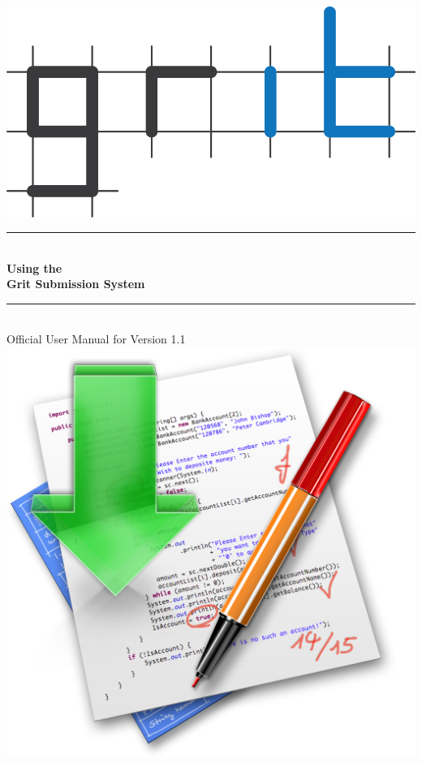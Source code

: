\documentclass[10pt,a4paper, titlepage, toc=idx]{scrreprt}
\newcommand{\HRule}{\rule{\linewidth}{0.5mm}}
\theoremstyle{definition}
\theoremstyle{plain}
\newcommand*{\product}{Grit}
\newcommand*{\version}{1.1}
\begin{document}
% 
\begin{titlepage}
  \begin{center}
			
			
    \includegraphics{pictures/grit}
			
    \HRule \\[0.4cm]
    { \huge \bfseries Using the\\\product{} Submission
      System \\[0.4cm] }
			
    \HRule \\[.5cm]
			
			
    {\small Official User Manual for Version \version}\\[1.5cm]
			
    \includegraphics[scale=.25]{pictures/1024}
			

\end{center}
\end{titlepage}
\end{document}
